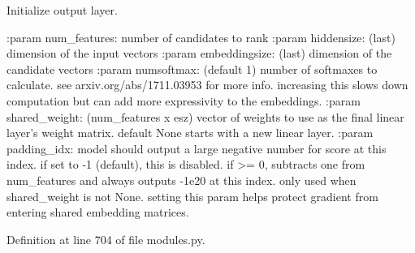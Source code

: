 \begin{DoxyVerb}Initialize output layer.

:param num_features:  number of candidates to rank
:param hiddensize:    (last) dimension of the input vectors
:param embeddingsize: (last) dimension of the candidate vectors
:param numsoftmax:   (default 1) number of softmaxes to calculate.
              see arxiv.org/abs/1711.03953 for more info.
              increasing this slows down computation but can
              add more expressivity to the embeddings.
:param shared_weight: (num_features x esz) vector of weights to use as
              the final linear layer's weight matrix. default
              None starts with a new linear layer.
:param padding_idx:   model should output a large negative number for
              score at this index. if set to -1 (default),
              this is disabled. if >= 0, subtracts one from
              num_features and always outputs -1e20 at this
              index. only used when shared_weight is not None.
              setting this param helps protect gradient from
              entering shared embedding matrices.
\end{DoxyVerb}
 

Definition at line 704 of file modules.\+py.


